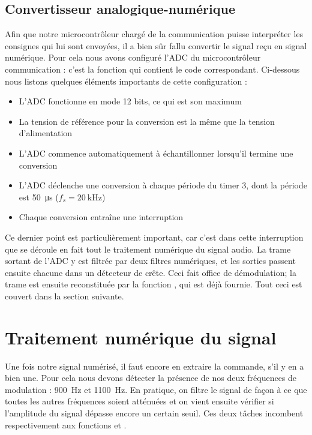 \subsection{Convertisseur analogique-numérique}
Afin que notre microcontrôleur chargé de la communication puisse interpréter les consignes qui lui sont envoyées, il a bien sûr fallu convertir le signal reçu en signal numérique. Pour cela nous avons configuré l'ADC du microcontrôleur communication : c'est la fonction  qui contient le code correspondant. Ci-dessous nous listons quelques éléments importants de cette configuration :
\begin{itemize}
\item L'ADC fonctionne en mode 12 bits, ce qui est son maximum
\item La tension de référence pour la conversion est la même que la tension d'alimentation
\item L'ADC commence automatiquement à échantillonner lorsqu'il termine une conversion
\item L'ADC déclenche une conversion à chaque période du timer 3, dont la période est \SI{50}{\micro\second} ($f_s = \SI{20}{\kilo\hertz}$)
\item Chaque conversion entraîne une interruption
\end{itemize}
Ce dernier point est particulièrement important, car c'est dans cette interruption que se déroule en fait tout le traitement numérique du signal audio. La trame sortant de l'ADC y est filtrée par deux filtres numériques, et les sorties passent ensuite chacune dans un détecteur de crête. Ceci fait office de démodulation; la trame est ensuite reconstituée par la fonction , qui est déjà fournie. Tout ceci est couvert dans la section suivante.

\section{Traitement numérique du signal}
Une fois notre signal numérisé, il faut encore en extraire la commande, s'il y en a bien une. Pour cela nous devons détecter la présence de nos deux fréquences de modulation : \SI{900}{\hertz} et \SI{1100}{\hertz}. En pratique, on filtre le signal de façon à ce que toutes les autres fréquences soient atténuées et on vient ensuite vérifier si l'amplitude du signal dépasse encore un certain seuil. Ces deux tâches incombent respectivement aux fonctions  et .

